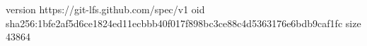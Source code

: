 version https://git-lfs.github.com/spec/v1
oid sha256:1bfe2af5d6ce1824ed11ecbbb40f017f898bc3ce88c4d5363176e6bdb9caf1fc
size 43864
